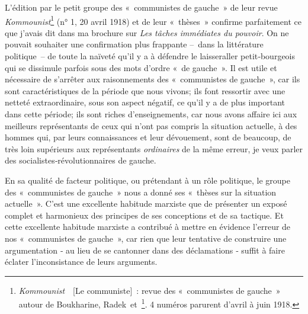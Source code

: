 \documentclass[french,twoside]{book} %
\begin{document}
  \noindent L’édition par le petit groupe des « communistes de gauche » de leur revue \emph{Kommounist}\footnote{\emph{Kommounist}  [Le communiste] : revue des « communistes de gauche » autour de Boukharine, Radek et \href{https://www.marxists.org/francais/bios/piatakov.htm}{}\footnote{\href{https://www.marxists.org/francais/bios/piatakov.htm}{\url{https://www.marxists.org/francais/bios/piatakov.htm}}}. 4 numéros parurent d’avril à juin 1918.} (n° 1, 20 avril 1918) et de leur « thèses » confirme parfaitement ce que j’avais dit dans ma brochure sur \emph{Les tâches immédiates du pouvoir}. On ne pouvait souhaiter une confirmation plus frappante – dans la littérature politique – de toute la naïveté qu’il y a à défendre le laisser­aller petit‑bourgeois qui se dissimule parfois sous des mots d’ordre « de gauche ». Il est utile et nécessaire de s’arrêter aux raisonnements des « communistes de gauche », car ils sont caractéristiques de la période que nous vivons; ils font ressortir avec une netteté extraordinaire, sous son aspect négatif, ce qu’il y a de plus important dans cette période; ils sont riches d’enseignements, car nous avons affaire ici aux meilleurs représentants de ceux qui n’ont pas compris la situation actuelle, à des hommes qui, par leurs connaissances et leur dévouement, sont de beaucoup, de très loin supérieurs aux représentants \emph{ordinaires} de la même erreur, je veux parler des socialistes‑révolutionnaires de gauche.\par
En sa qualité de facteur politique, ou prétendant à un rôle politique, le groupe des « communistes de gauche » nous a donné ses « thèses sur la situation actuelle ». C’est une excellente habitude marxiste que de présenter un exposé complet et harmonieux des principes de ses conceptions et de sa tactique. Et cette excellente habitude marxiste a contribué à mettre en évidence l’erreur de nos \hspace{1em}« communistes de gauche », car rien que leur tentative de construire une argumentation ‑ au lieu de se cantonner dans des déclamations ‑ suffit à faire éclater l’inconsistance de leurs arguments.\par
\end{document}
